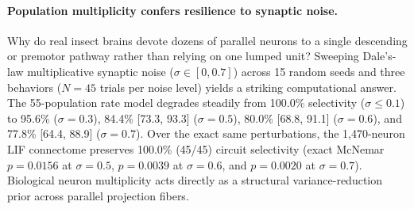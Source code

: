 \documentclass[10pt,twocolumn,letterpaper]{article}
\begin{document}
\begin{table}[t]
\centering
\caption{\textbf{In-silico Chrimson optogenetics and Kir2.1 silencing in the 1,470-neuron LIF \emph{Drosophila} connectome.}}
\label{tab:exp4_causal}
\scriptsize
\setlength{\tabcolsep}{2.5pt}
\end{table}

\paragraph{Population multiplicity confers resilience to synaptic noise.}
Why do real insect brains devote dozens of parallel neurons to a single descending or premotor pathway rather than relying on one lumped unit? Sweeping Dale's-law multiplicative synaptic noise ($\sigma \in [0, 0.7]$) across 15 random seeds and three behaviors ($N=45$ trials per noise level) yields a striking computational answer. The 55-population rate model degrades steadily from 100.0\% selectivity ($\sigma \le 0.1$) to 95.6\% ($\sigma=0.3$), 84.4\% [73.3, 93.3] ($\sigma=0.5$), 80.0\% [68.8, 91.1] ($\sigma=0.6$), and 77.8\% [64.4, 88.9] ($\sigma=0.7$). Over the exact same perturbations, the 1,470-neuron LIF connectome preserves 100.0\% (45/45) circuit selectivity (exact McNemar $p=0.0156$ at $\sigma=0.5$, $p=0.0039$ at $\sigma=0.6$, and $p=0.0020$ at $\sigma=0.7$). Biological neuron multiplicity acts directly as a structural variance-reduction prior across parallel projection fibers.
\end{document}
